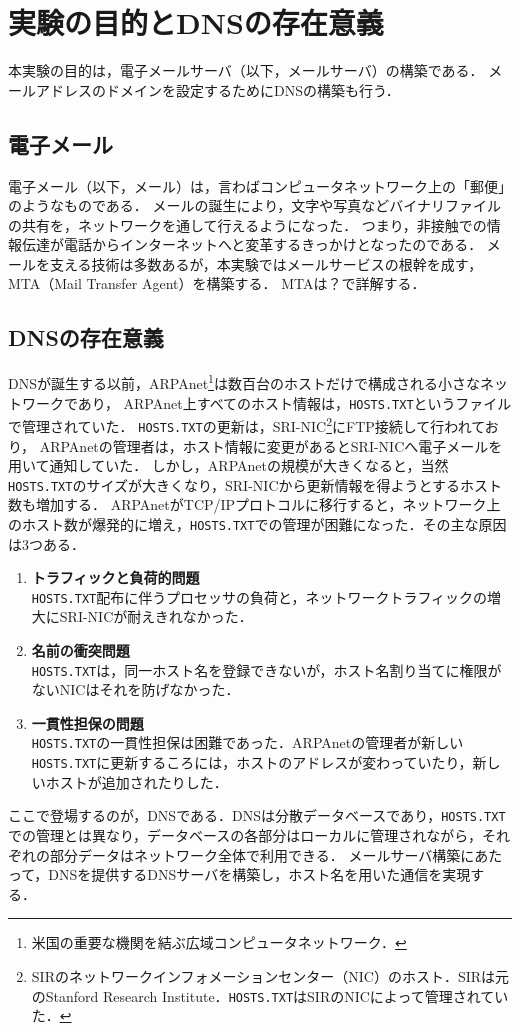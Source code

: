 \chapter{実験の目的とDNSの存在意義}
本実験の目的は，電子メールサーバ（以下，メールサーバ）の構築である．
メールアドレスのドメインを設定するためにDNSの構築も行う．
\section{電子メール}
電子メール（以下，メール）は，言わばコンピュータネットワーク上の「郵便」のようなものである．
メールの誕生により，文字や写真などバイナリファイルの共有を，ネットワークを通して行えるようになった．
つまり，非接触での情報伝達が電話からインターネットへと変革するきっかけとなったのである．
メールを支える技術は多数あるが，本実験ではメールサービスの根幹を成す，MTA（Mail Transfer Agent）を構築する．
MTAは？で詳解する．
\section{DNSの存在意義}
DNSが誕生する以前，ARPAnet\footnote{米国の重要な機関を結ぶ広域コンピュータネットワーク\cite[p.1]{DNSBIND}．}は数百台のホストだけで構成される小さなネットワークであり，
ARPAnet上すべてのホスト情報は，\texttt{HOSTS.TXT}というファイルで管理されていた．
\texttt{HOSTS.TXT}の更新は，SRI-NIC\footnote{SIRのネットワークインフォメーションセンター（NIC）のホスト．SIRは元のStanford Research Institute．\texttt{HOSTS.TXT}はSIRのNICによって管理されていた．}にFTP接続して行われており，
ARPAnetの管理者は，ホスト情報に変更があるとSRI-NICへ電子メールを用いて通知していた．
しかし，ARPAnetの規模が大きくなると，当然\texttt{HOSTS.TXT}のサイズが大きくなり，SRI-NICから更新情報を得ようとするホスト数も増加する\cite[p.3]{DNSBIND}．
ARPAnetがTCP/IPプロトコルに移行すると，ネットワーク上のホスト数が爆発的に増え，\texttt{HOSTS.TXT}での管理が困難になった．その主な原因は3つある．
\begin{enumerate}
      \item \textbf{トラフィックと負荷的問題}\\
            \texttt{HOSTS.TXT}配布に伴うプロセッサの負荷と，ネットワークトラフィックの増大にSRI-NICが耐えきれなかった．
      \item \textbf{名前の衝突問題}\\
            \texttt{HOSTS.TXT}は，同一ホスト名を登録できないが，ホスト名割り当てに権限がないNICはそれを防げなかった．
      \item \textbf{一貫性担保の問題}\\
            \texttt{HOSTS.TXT}の一貫性担保は困難であった．ARPAnetの管理者が新しい\texttt{HOSTS.TXT}に更新するころには，ホストのアドレスが変わっていたり，新しいホストが追加されたりした．
\end{enumerate}
\hfill\cite[p.4]{DNSBIND}\par
ここで登場するのが，DNSである．DNSは分散データベースであり，\texttt{HOSTS.TXT}での管理とは異なり，データベースの各部分はローカルに管理されながら，それぞれの部分データはネットワーク全体で利用できる\cite[p.5]{DNSBIND}．
メールサーバ構築にあたって，DNSを提供するDNSサーバを構築し，ホスト名を用いた通信を実現する．